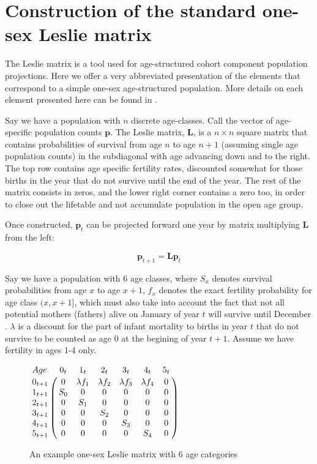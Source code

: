 \chapter{Construction of the standard one-sex Leslie matrix}
\label{Appendix:Caswell}
The Leslie matrix\citep{leslie1945use} is a tool used for age-structured cohort 
component population projections. Here we offer a very abbreviated presentation of the elements that
correspond to a simple one-sex age-structured population. More details on 
each element presented here can be found in \cite{caswell2001matrix}.

Say we have a population with $n$ discrete age-classes. Call the vector of
age-specific population counts $\textbf{p}$. The Leslie matrix, $\textbf{L}$, is a $n \times
n$ square matrix that contains probabilities of survival from age $n$ to age
$n+1$ (assuming single age population counts) in the subdiagonal with age
advancing down and to the right. The top row contains age specific fertility
rates, discounted somewhat for those births in the year that do not survive
until the end of the year. The rest of the matrix consists in zeros, and the
lower right corner contains a zero too, in order to close out the lifetable and
not accumulate population in the open age group.

Once constructed, $\textbf{p}_t$ can be projected forward one year by matrix
multiplying $\textbf{L}$ from the left:

\begin{equation}
\textbf{p}_{t+1} = \textbf{L}\textbf{p}_{t} 
\end{equation}

Say we have a population with 6 age classes, where
$S_x$ denotes survival probabilities from age $x$ to age $x+1$, $f_x$ denotes
the exact fertility probability for age class $(x,x+1]$, which must also take
into account the fact that not all potential mothers (fathers) alive on January
 of year $t$ will survive until December . $\lambda$ is a discount for the part of
infant mortality to births in year $t$ that do not survive to be counted as 
age 0 at the begining of year $t+1$. Assume we have fertility in ages 1-4 only.

\begin{figure}
\centering
\caption*{An example one-sex Leslie matrix with 6 age categories}
$\bordermatrix{{Age }      & 0_t & 1_t     & 2_t &  3_t & 4_t & 5_t\cr
                0_{t+1} & 0 & \lambda f_1 & \lambda f_2 & \lambda f_3 & \lambda f_4 & 0\cr 
                1_{t+1} & S_0  &  0       & 0    & 0     & 0   & 0   \cr
                2_{t+1} & 0    &  S_1     & 0    & 0     & 0    & 0   \cr 
                3_{t+1} & 0    &  0       & S_2  & 0     & 0    & 0   \cr 
                4_{t+1} & 0    &  0       & 0    & S_3   & 0    & 0   \cr
                5_{t+1} & 0    &  0       & 0    & 0     & S_4  & 0   }$
\end{figure}

